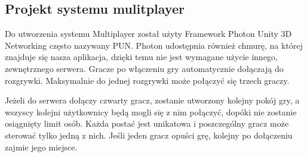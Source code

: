 \subsection{Projekt systemu mulitplayer}
Do utworzenia systemu Multiplayer został użyty Framework Photon Unity 3D Networking często nazywany PUN. 
Photon udostępnia również chmurę, na której znajduje się nasza aplikacja, dzięki temu nie jest wymagane użycie innego, zewnętrznego serwera. 
Gracze po włączeniu gry automatycznie dołączają do rozgrywki. Maksymalnie do jednej rozgrywki może połączyć się trzech graczy. 

Jeżeli do serwera dołączy czwarty gracz, zostanie utworzony kolejny pokój gry, a wszyscy kolejni użytkownicy będą mogli się z nim połączyć, dopóki nie zostanie osiągnięty limit osób. 
Każda postać jest unikatowa i poszczególny gracz może sterować tylko jedną z nich. Jeśli jeden gracz opuści grę, kolejny po dołączeniu zajmie jego miejsce. 